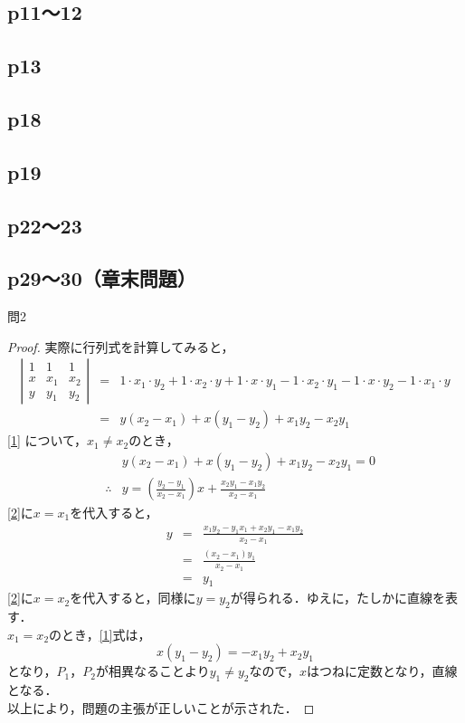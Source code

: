 \documentclass[dvipdfmx,uplatex,11pt]{jsarticle}
\begin{document}
\subsection{p11〜12}
%
%
%
\newpage
%
%
%
\subsection{p13}
%
%
%
\newpage
%
%
%
\subsection{p18}
%
%
%
\newpage
%
%
%
\subsection{p19}
%
%
%
\newpage
%
%
%
\subsection{p22〜23}
%
%
%
\newpage
%
%
%
\setcounter{equation}{0}
\subsection{p29〜30（章末問題）}
%
%
%
問2\\
\noindent
\begin{leftbar}
\begin{proof}
実際に行列式を計算してみると，
\begin{eqnarray}
\left |
\begin{array}{ccc}
1 & 1 & 1 \\
x & x_1 & x_2 \\
y & y_1 & y_2 
\end{array}
\right |
& = & 1 \cdot x_1 \cdot y_2 +1 \cdot x_2 \cdot y + 1 \cdot x \cdot y_1 - 1 \cdot x_2 \cdot y_1 - 1 \cdot x \cdot y_2 - 1 \cdot x_1 \cdot y \\
\label{1}
& = & y(x_2 -x_1) + x ( y_1 - y_2 ) +x_1 y_2 - x_2 y_1
\end{eqnarray}
\eqref{1} について，$x_1 \neq x_2$のとき，
\begin{eqnarray}
& & y(x_2 -x_1) + x ( y_1 - y_2 ) +x_1 y_2 - x_2 y_1=0 \\
\label{2}
& \therefore &y=  \left( \frac{y_2 - y_1}{x_2 -x_1} \right)x  + \frac{x_2 y_1 - x_1 y_2 }{x_2 -x_1}
\end{eqnarray}
\eqref{2}に$x=x_1$を代入すると，
\begin{eqnarray}
y&=& \frac{x_1 y_2 -y_1 x_1 +x_2 y_1 - x_1 y_2}{x_2-x_1} \\
& = & \frac{(x_2 - x_1)y_1}{x_2 - x_1} \\
&=&y_1
\end{eqnarray}
\eqref{2}に$x=x_2$を代入すると，同様に$y=y_2$が得られる．ゆえに，たしかに直線を表す．\\
$x_1 = x_2$のとき，\eqref{1}式は，
\begin{equation}
x(y_1 - y_2) = -x_1 y_2 + x_2 y_1
\end{equation}
となり，$P_1$，$P_2$が相異なることより$y_1 \neq y_2$なので，$x$はつねに定数となり，直線となる．\\
以上により，問題の主張が正しいことが示された．
\end{proof}
\end{leftbar}
\end{document}
